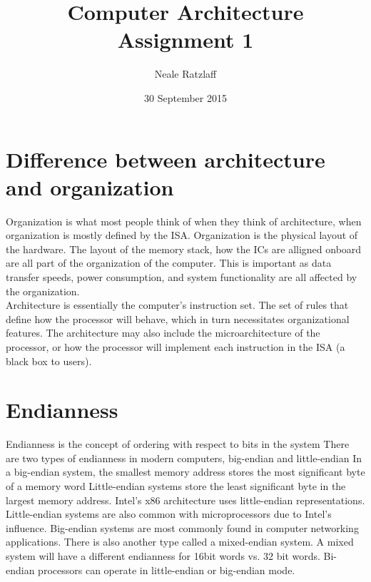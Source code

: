 \documentclass[letterpaper,10pt,titlepage]{article}
\title{Computer Architecture Assignment 1}
\author{Neale Ratzlaff}
\date{30 September 2015}
\begin{document}
\maketitle
\pagebreak

\section{Difference between architecture and organization}
    
    Organization is what most people think of when they think of architecture,
    when organization is mostly defined by the ISA. Organization is the physical layout of the 
    hardware. The layout of the memory stack, how the ICs are alligned onboard are all part 
    of the organization of the computer. This is important as data transfer speeds, power
    consumption, and system functionality are all affected by the organization. \\ 

    Architecture is essentially the computer's instruction set. The set of rules that define how 
    the processor will behave, which in turn necessitates organizational features. The architecture
    may also include the microarchitecture of the processor, or how the processor will implement
    each instruction in the ISA (a black box to users). 


\pagebreak

\section{Endianness}

    Endianness is the concept of ordering with respect to bits in the system 
    There are two types of endianness in modern computers, big-endian and little-endian 
    In a big-endian system, the smallest memory address stores the most significant byte of a memory word 
    Little-endian systems store the least significant byte in the largest memory address. 
    Intel's x86 architecture uses little-endian representations. Little-endian systems 
    are also common with microprocessors due to Intel's influence. Big-endian 
    systems are most commonly found in computer networking applications. 
    There is also another type called a mixed-endian system. A mixed system will have 
    a different endianness for 16bit words vs. 32 bit words. Bi-endian processors 
    can operate in little-endian or big-endian mode. 
    
\end{document}
